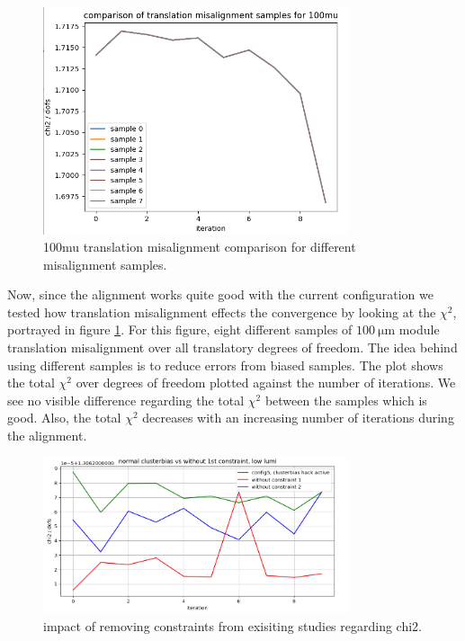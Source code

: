 \begin{figure}
  \centering
  \includegraphics[width=0.8\textwidth]{plots/feb_6_2022/100mu_misalignment_samples_compared.png}
  \caption{100mu translation misalignment comparison for different misalignment samples.}
  \label{fig:100muT}
\end{figure}

Now, since the alignment works quite good with the current configuration we
tested how translation misalignment effects the convergence by looking at the
$\chi^2$, portrayed in figure \ref{fig:100muT}. For this figure, eight different samples of $\SI{100}{\micro\metre}$ module translation misalignment over all translatory
degrees of freedom. The idea behind using different samples is to reduce errors
from biased samples. The plot shows the total $\chi^2$ over degrees of freedom
plotted against the number of iterations. We see no visible difference regarding
the total $\chi^2$ between the samples which is good.
Also, the total $\chi^2$ decreases with an increasing number of iterations
during the alignment.

\begin{figure}
  \centering
  \includegraphics[width=0.8\textwidth]{plots/feb_6_2022/low_lumi_removed_constraints_vs_normal.png}
  \caption{impact of removing constraints from exisiting studies regarding chi2.}
  \label{fig:removeConst}
\end{figure}


